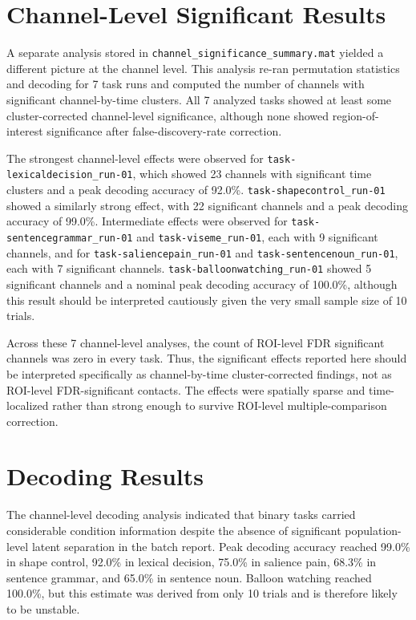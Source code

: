 \section{Channel-Level Significant Results}

A separate analysis stored in
\texttt{channel\_significance\_summary.mat} yielded a different picture
at the channel level. This analysis re-ran permutation statistics and
decoding for 7 task runs and computed the number of channels with
significant channel-by-time clusters. All 7 analyzed tasks showed at
least some cluster-corrected channel-level significance, although none
showed region-of-interest significance after false-discovery-rate
correction.

The strongest channel-level effects were observed for
\texttt{task-lexicaldecision\_run-01}, which showed 23 channels with
significant time clusters and a peak decoding accuracy of 92.0\%.
\texttt{task-shapecontrol\_run-01} showed a similarly strong effect,
with 22 significant channels and a peak decoding accuracy of 99.0\%.
Intermediate effects were observed for
\texttt{task-sentencegrammar\_run-01} and
\texttt{task-viseme\_run-01}, each with 9 significant channels, and for
\texttt{task-saliencepain\_run-01} and
\texttt{task-sentencenoun\_run-01}, each with 7 significant channels.
\texttt{task-balloonwatching\_run-01} showed 5 significant channels and
a nominal peak decoding accuracy of 100.0\%, although this result should
be interpreted cautiously given the very small sample size of 10 trials.

Across these 7 channel-level analyses, the count of ROI-level FDR
significant channels was zero in every task. Thus, the significant
effects reported here should be interpreted specifically as
channel-by-time cluster-corrected findings, not as ROI-level
FDR-significant contacts. The effects were spatially sparse and
time-localized rather than strong enough to survive ROI-level
multiple-comparison correction.

\section{Decoding Results}

The channel-level decoding analysis indicated that binary tasks carried
considerable condition information despite the absence of significant
population-level latent separation in the batch report. Peak decoding
accuracy reached 99.0\% in shape control, 92.0\% in lexical decision,
75.0\% in salience pain, 68.3\% in sentence grammar, and 65.0\% in
sentence noun. Balloon watching reached 100.0\%, but this estimate was
derived from only 10 trials and is therefore likely to be unstable.

